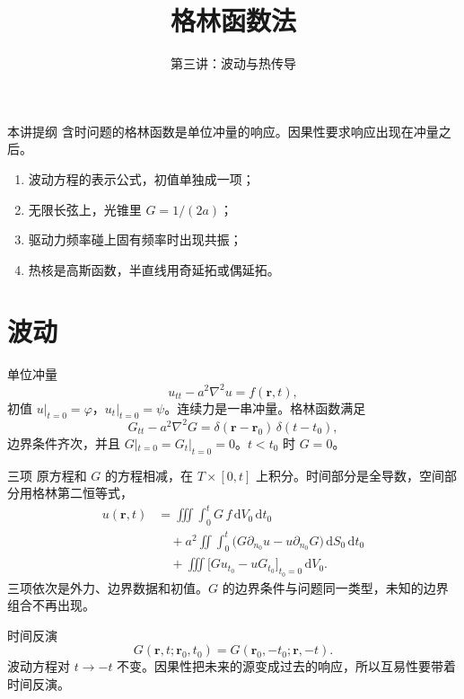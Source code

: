 \documentclass[fontset=windows, chinese, 10pt, xcolor=dvipsnames]{beamer}
\title{格林函数法}
\subtitle{第三讲：波动与热传导}
\begin{document}
\begin{frame}
  \titlepage
\end{frame}

\begin{frame}{本讲提纲}
  含时问题的格林函数是单位冲量的响应。因果性要求响应出现在冲量之后。
  \begin{enumerate}
    \item 波动方程的表示公式，初值单独成一项；
    \item 无限长弦上，光锥里 $G=1/(2a)$；
    \item 驱动力频率碰上固有频率时出现共振；
    \item 热核是高斯函数，半直线用奇延拓或偶延拓。
  \end{enumerate}
\end{frame}

\section{波动}

\begin{frame}{单位冲量}
  \[
    u_{tt}-a^2\nabla^2 u=f(\mathbf{r},t),
  \]
  初值 $u|_{t=0}=\varphi$，$u_t|_{t=0}=\psi$。连续力是一串冲量。格林函数满足
  \[
    G_{tt}-a^2\nabla^2 G
    =\delta(\mathbf{r}-\mathbf{r}_0)\,\delta(t-t_0),
  \]
  边界条件齐次，并且 $G|_{t=0}=G_t|_{t=0}=0$。$t<t_0$ 时 $G=0$。
\end{frame}

\begin{frame}{三项}
  原方程和 $G$ 的方程相减，在 $T\times[0,t]$ 上积分。时间部分是全导数，空间部分用格林第二恒等式，
  \begin{align*}
    u(\mathbf{r},t)
    &=\iiint\int_0^{t} G\,f\,\mathrm{d}V_0\,\mathrm{d}t_0\\
    &\quad+a^2\iint\int_0^{t}
        \bigl(G\partial_{n_0}u-u\partial_{n_0}G\bigr)
        \,\mathrm{d}S_0\,\mathrm{d}t_0\\
    &\quad+\iiint\bigl[G u_{t_0}-u G_{t_0}\bigr]_{t_0=0}\,\mathrm{d}V_0.
  \end{align*}
  三项依次是外力、边界数据和初值。$G$ 的边界条件与问题同一类型，未知的边界组合不再出现。
\end{frame}

\begin{frame}{时间反演}
  \[
    G(\mathbf{r},t;\mathbf{r}_0,t_0)
    =G(\mathbf{r}_0,-t_0;\mathbf{r},-t).
  \]
  波动方程对 $t\to -t$ 不变。因果性把未来的源变成过去的响应，所以互易性要带着时间反演。
\end{frame}
\end{document}
